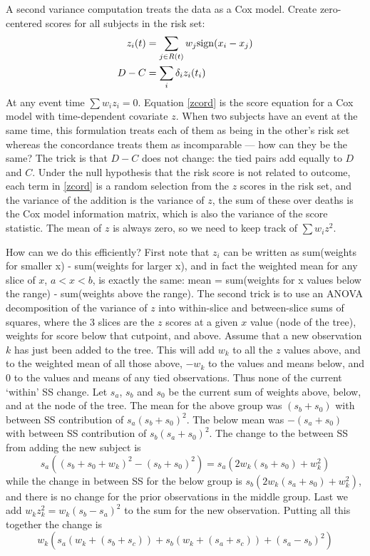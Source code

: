 \documentclass{article}
\newcommand{\sign}{{\rm sign}}
\begin{document}
A second variance computation treats the data as a Cox model.
Create zero-centered scores for all subjects in the risk set:
\begin{align}
  z_i(t) &= \sum_{j \in R(t)} w_j \sign(x_i - x_j) \nonumber \\
  D-C &= \sum_i \delta_i z_i(t_i)              \label{zcord}
\end{align}
At any event time $\sum w_i z_i =0$.  
Equation \eqref{zcord} is the score equation
for a Cox model with time-dependent covariate $z$.
When two subjects have an event at the same time, this formulation treats
each of them as being in the other's risk set whereas the concordance
treats them as incomparable --- how can they be the same?
The trick is that $D-C$ does not change: the tied pairs add equally to
$D$ and $C$.
Under the null hypothesis that the risk score is not related to outcome,
each term in \eqref{zcord} is a random selection from the $z$ scores in
the risk set, and the variance of the addition is the variance of $z$,
the sum of these over deaths is the Cox model information matrix,
which is also the variance of the score statistic.
The mean of $z$ is always zero, so we need to keep track of 
$\sum w_i z^2$. 

How can we do this efficiently?  First note that $z_i$ can be written
as sum(weights for smaller x) - sum(weights for larger x), and in fact the
weighted mean for any slice of $x$, $a < x < b$, is exactly the
same: mean = sum(weights for x values below the range) - 
 sum(weights above the range).
The second trick is to use an ANOVA decomposition of the variance of $z$ into
within-slice and between-slice sums of squares, where the 3 slices are the
$z$ scores at a given $x$ value (node of the tree), weights for score below that
cutpoint, and above.
Assume that a new observation $k$ has just been added to the tree.  
This will add $w_k$ to all the $z$ values above, and to the weighted mean of
all those above, $-w_k$ to the values and means below, and 0 to the values and
means of any tied observations.  Thus none of the current `within'
SS change.  
Let $s_a$, $s_b$ and $s_0$ be the current sum of weights above, below, and
at the node of the tree.  The mean for the above group was $(s_b + s_0)$ with
between SS contribution of $s_a (s_b + s_0)^2$.  The below mean was 
$-(s_a + s_0)$  with between SS contribution of $s_b(s_a + s_0)^2$.
The change to the between SS from adding the new subject is
$$
s_a\left( (s_b+s_0 + w_k)^2 - (s_b + s_0)^2 \right) =
s_a (2w_k (s_b + s_0) + w_k^2)
$$
while the change in between SS for the below group 
is $s_b(2w_k(s_a + s_0) + w_k^2)$, and there is no change for the 
prior observations in the middle group.
Last we add $w_kz_k^2 = w_k(s_b- s_a)^2$ to the sum for the new observation.
Putting all this together the change is
$$
  w_k \left(s_a (w_k + (s_b + s_c)) + s_b(w_k + (s_a + s_c)) + (s_a-s_b)^2 \right)
$$
\end{document}
